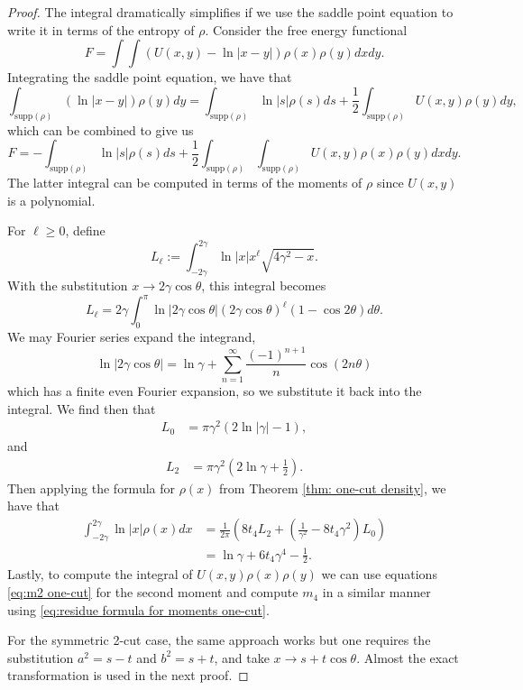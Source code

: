 \documentclass[10pt]{article}
\theoremstyle{plain}
\theoremstyle{definition}
\theoremstyle{plain}
\begin{document}
\begin{proof}
    The integral dramatically simplifies if we use the saddle point equation to write it in terms of the entropy of $\rho$. Consider the free energy functional
\begin{equation*}
 F = \int \int(U(x,y) - \ln|x-y|)\rho(x)\rho(y)dx dy. 
\end{equation*}
Integrating the saddle point equation, we have that 
\begin{equation*}
 \int_{\text{supp}( \rho)}( \ln|x-y|) \rho(y)dy = \int_{\text{supp}( \rho)} \ln|s| \rho(s)ds +\frac{1}{2}\int_{\text{supp}( \rho)} U(x,y)\rho(y)dy,
\end{equation*}
which can be combined to give us
\begin{equation*}
 F = -\int_{\text{supp}( \rho)} \ln|s| \rho(s)ds + \frac{1}{2}\int_{\text{supp}( \rho)}\int_{\text{supp}( \rho)} U(x,y)\rho(x)\rho(y)dx dy.
\end{equation*}
The latter integral can be computed in terms of the moments of $\rho$ since $U(x,y)$ is a polynomial. 

For $\ell\geq 0$, define
$$L_{\ell} :=\int_{-2\gamma}^{2\gamma} \ln|x|x^{\ell} \sqrt{4\gamma^2-x}.$$
With the substitution $x \rightarrow 2 \gamma \cos \theta$, this integral becomes
\begin{equation*}
    L_{\ell} =2 \gamma \int_{0}^{\pi} \ln |2 \gamma \cos \theta| (2 \gamma \cos \theta)^{\ell}(1 - \cos2 \theta) d\theta.
\end{equation*}
We may Fourier series expand the integrand,
\begin{equation*}
    \ln |2 \gamma \cos \theta| = \ln \gamma + \sum_{n=1}^{\infty} \frac{(-1)^{n+1}}{n} \cos (2 n \theta)
\end{equation*}
which has a finite even Fourier expansion, so we substitute it back into the integral. We find then that 
\begin{align*}
    L_{0} &= \pi \gamma^2 (2 \ln |\gamma| -1),
    \end{align*}
and
    \begin{align*}
    L_{2}&= \pi \gamma^2 \left(2 \ln \gamma + \frac{1}{2}\right).
\end{align*}
Then applying the formula for $\rho(x)$ from Theorem \ref{thm: one-cut density}, we have that 
\begin{align*}
\int_{-2\gamma}^{2 \gamma}\ln |x| \rho(x)dx&= \frac{1}{2\pi}\left(8 t_{4} L_{2} + \left( \frac{1}{\gamma^2} - 8 t_{4} \gamma^2\right)L_{0} \right)\\
&=\ln\gamma + 6 t_{4} \gamma^{4} -\frac{1}{2}. 
\end{align*}
Lastly, to compute the integral of $U(x,y)\rho(x)\rho(y)$ we can use equations \eqref{eq:m2 one-cut} for the second moment and compute $m_{4}$ in a similar manner using \eqref{eq:residue formula for moments one-cut}.

For the symmetric 2-cut case, the same approach works but one requires the substitution $a^2 = s-t$ and $b^2 = s+t$, and take $x \rightarrow s+ t \cos \theta$. Almost the exact transformation is used in the next proof.

\end{proof}
\end{document}
